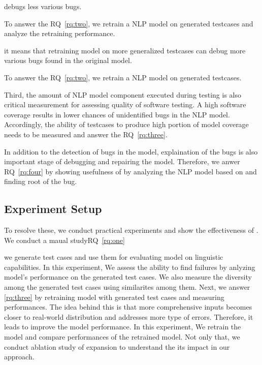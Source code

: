 debugs less various bugs.

To answer the RQ~\ref{rq:two}, we retrain
a NLP model on generated testcases and analyze the retraining performance.

it means that retraining model on more
generalized testcases can debug more various bugs found in the
original model.

To answer the RQ~\ref{rq:two}, we retrain a NLP model on generated testcases.

Third, the amount of NLP
model component executed during testing is also critical measurement
for assessing quality of software testing. A high software coverage
results in lower chances of unidentified bugs in the NLP
model. Accordingly, the ability of testcases to produce high portion
of model coverage needs to be measured and answer the
RQ~\ref{rq:three}.

In addition to the detection of bugs in the model,
explaination of the bugs is also important stage of debugging and
repairing the model. Therefore, we anwer RQ~\ref{rq:four} by showing
usefulness of \tool by analyzing the NLP model based on \tool and
finding root of the bug.

\subsection{Experiment Setup}

To resolve these, we conduct practical experiments and show the
effectiveness of \tool. We conduct a maual studyRQ~\ref{rq:one}

we generate test cases and use
them for evaluating model on linguistic capabilities. In this
experiment, We assess the ability to find failures by anlyzing model's
performance on the generated test cases. We also measure the diversity
among the generated test cases using similarites among them. Next, we
answer \ref{rq:three} by retraining \sa model with generated test
cases and measuring performances. The idea behind this is that more
comprehensive inputs becomes closer to real-world distribution and
addresses more type of errors.  Therefore, it leads to improve the
model performance. In this experiment, We retrain the model and
compare performances of the retrained model. Not only that, we conduct
ablation study of \cfg expansion to understand the its impact in our
approach.





